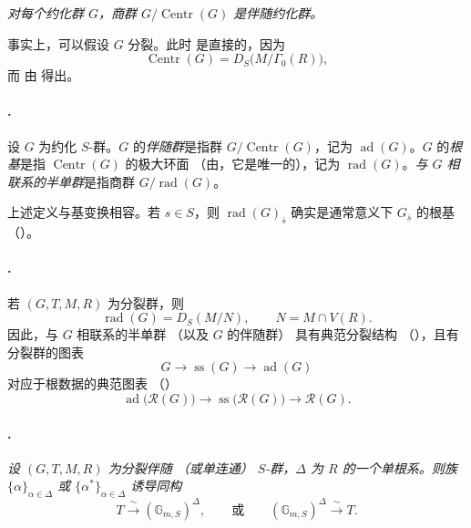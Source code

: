 \textit{\textup{} 对每个约化群 \(G\)，商群 \(G/\operatorname{Centr}(G)\) 是伴随约化群。}

事实上，可以假设 \(G\) 分裂。此时 \textup{} 是直接的，因为
\[
  \operatorname{Centr}(G)=D_S\bigl(M/\Gamma_0(R)\bigr),
\]
而 \textup{} 由  得出。

\paragraph{.}
设 \(G\) 为约化 \(S\)-群。\(G\) 的\emph{伴随群}是指群 \(G/\operatorname{Centr}(G)\)，记为 \(\operatorname{ad}(G)\)。\(G\) 的\emph{根基}是指 \(\operatorname{Centr}(G)\) 的极大环面 \textup{（由，它是唯一的）}，记为 \(\operatorname{rad}(G)\)。\emph{与 \(G\) 相联系的半单群}是指商群 \(G/\operatorname{rad}(G)\)。

上述定义与基变换相容。若 \(s\in S\)，则 \(\operatorname{rad}(G)_{\bar s}\) 确实是通常意义下 \(G_{\bar s}\) 的根基 \textup{（）}。

\paragraph{.}
若 \((G,T,M,R)\) 为分裂群，则
\[
  \operatorname{rad}(G)=D_S(M/N),
  \qquad
  N=M\cap V(R).
\]
因此，与 \(G\) 相联系的半单群 \textup{（以及 \(G\) 的伴随群）} 具有典范分裂结构 \textup{（）}，且有分裂群的图表
\[
  G\longrightarrow \operatorname{ss}(G)
   \longrightarrow \operatorname{ad}(G)
\]
对应于根数据的典范图表 \textup{（）}
\[
  \operatorname{ad}\bigl(\mathscr R(G)\bigr)
  \longrightarrow
  \operatorname{ss}\bigl(\mathscr R(G)\bigr)
  \longrightarrow
  \mathscr R(G).
\]

\paragraph{.}
\textit{设 \((G,T,M,R)\) 为分裂伴随 \textup{（或单连通）} \(S\)-群，\(\Delta\) 为 \(R\) 的一个单根系。则族 \(\{\alpha\}_{\alpha\in\Delta}\) 或 \(\{\alpha^*\}_{\alpha\in\Delta}\) 诱导同构}
\[
  T\xrightarrow{\ \sim\ }(\mathbb G_{m,S})^\Delta,
  \qquad\textit{或}\qquad
  (\mathbb G_{m,S})^\Delta\xrightarrow{\ \sim\ }T.
\]

